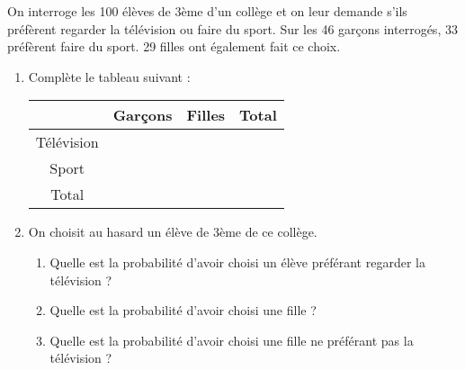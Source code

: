 
On interroge les 100 élèves de 3ème d'un collège et on leur demande s'ils préfèrent regarder
la télévision ou faire du sport.
Sur les 46 garçons interrogés, 33 préfèrent faire du sport. 29 filles ont également fait ce
choix.

\begin{enumerate}
\item Complète le tableau suivant :
 
 \begin{tabular}{|c|c|c|c|}
 \hline 
  & Garçons & Filles & Total \\ 
 \hline 
 Télévision &  &  &  \\ 
 \hline 
 Sport &  &  &  \\ 
 \hline 
 Total &  &  &  \\ 
 \hline 
 \end{tabular} 
 
 
\item On choisit au hasard un élève de 3ème de ce collège.
\begin{enumerate}
\item Quelle est la probabilité d'avoir choisi un élève préférant regarder la télévision ?
\item Quelle est la probabilité d'avoir choisi une fille ?
\item Quelle est la probabilité d'avoir choisi une fille ne préférant pas la télévision ?
\end{enumerate}
\end{enumerate}